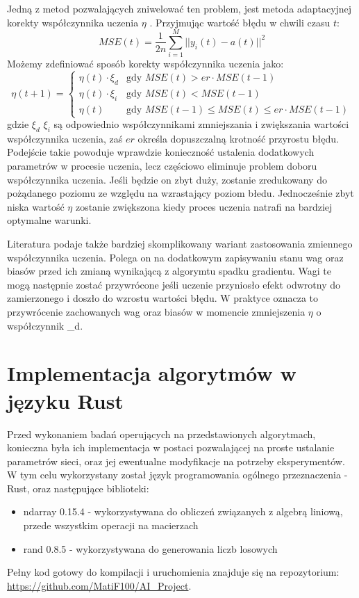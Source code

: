 \documentclass[12pt,twoside]{article}
\begin{document}
Jedną z metod pozwalających zniwelować ten problem, jest metoda adaptacyjnej korekty współczynnika uczenia $\eta $\cite{kiaAcc} \cite{nnd}.
Przyjmując wartość błędu w chwili czasu $t$:
\begin{equation}
	\label{eq:costFunctionTimed}
	MSE(t) = \frac{1}{2n} \sum_{i=1}^{M}  || y_{i}(t) - a(t) ||^2
\end{equation}
Możemy \cite{kiaAcc} \cite{nnd} zdefiniować sposób korekty współczynnika uczenia jako:
\begin{equation}
	\label{eq:adaptiveLR}
	\eta \left( t + 1 \right)  =
	\begin{cases}
		\eta \left( t \right) \cdot \xi_d & \text{gdy } MSE(t) > er \cdot MSE(t-1)\\
		\eta \left( t \right) \cdot \xi_i & \text{gdy } MSE(t) <  MSE(t-1)\\
		\eta \left( t \right)  & \text{gdy } MSE(t-1) \leq MSE(t) \leq er \cdot MSE(t-1)
	\end{cases}
\end{equation}
gdzie $\xi_d$ $\xi_i$ są odpowiednio współczynnikami zmniejszania i zwiększania wartości współczynnika uczenia, zaś $er$ określa dopuszczalną krotność przyrostu błędu.
Podejście takie powoduje wprawdzie konieczność ustalenia dodatkowych parametrów w procesie uczenia, lecz częściowo eliminuje \cite{nnd} problem doboru współczynnika uczenia.
Jeśli będzie on zbyt duży, zostanie zredukowany do pożądanego poziomu ze względu na wzrastający poziom błedu.
Jednocześnie zbyt niska wartość $\eta$ zostanie zwiększona kiedy proces uczenia natrafi na bardziej optymalne warunki.

Literatura \cite{nnd} podaje także bardziej skomplikowany wariant zastosowania zmiennego współczynnika uczenia.
Polega on na dodatkowym zapisywaniu stanu wag oraz biasów przed ich zmianą wynikającą z algorymtu spadku gradientu.
Wagi te mogą następnie zostać przywrócone jeśli uczenie przyniosło efekt odwrotny do zamierzonego i doszło do wzrostu wartości błędu.
W praktyce oznacza to przywrócenie zachowanych wag oraz biasów w momencie zmniejszenia $\eta$ o współczynnik \xi_d.

\clearpage
\section{Implementacja algorytmów w języku Rust}
Przed wykonaniem badań operujących na przedstawionych algorytmach, konieczna była ich implementacja w postaci pozwalającej na proste ustalanie parametrów sieci, oraz jej ewentualne modyfikacje na potrzeby eksperymentów.
W tym celu wykorzystany został język programowania ogólnego przeznaczenia - Rust, oraz następujące biblioteki:
\begin{itemize}
	\item ndarray 0.15.4 - wykorzystywana do obliczeń związanych z algebrą liniową, przede wszystkim operacji na macierzach
	\item rand 0.8.5 - wykorzystywana do generowania liczb losowych
\end{itemize}
Pełny kod gotowy do kompilacji i uruchomienia znajduje się na repozytorium:\\ \url{https://github.com/MatiF100/AI_Project}.
\end{document}
